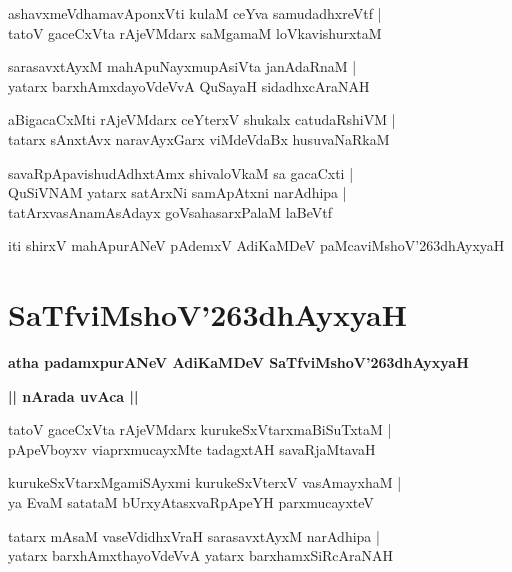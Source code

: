 \documentclass[twoside,12pt,openright]{book}
\def\S{\char'263}
\newcounter{shloka}[chapter]
\def\uvaca#1{\centerline{{\large\textbf{#1}}}}
\begin{document}
\begin{shloka}
ashavxmeVdhamavAponxVti kulaM ceYva samudadhxreVtf |\\
tatoV gaceCxVta rAjeVMdarx saMgamaM loVkavishurxtaM 
\end{shloka}

\begin{shloka}
sarasavxtAyxM mahApuNayxmupAsiVta janAdaRnaM  |\\
yatarx barxhAmxdayoVdeVvA QuSayaH sidadhxcAraNAH 
\end{shloka}


\begin{shloka}
aBigacaCxMti rAjeVMdarx ceYterxV shukalx catudaRshiVM |\\
tatarx sAnxtAvx naravAyxGarx viMdeVdaBx husuvaNaRkaM 
\end{shloka}

\begin{shloka}
savaRpApavishudAdhxtAmx shivaloVkaM sa gacaCxti |\\
QuSiVNAM yatarx satArxNi samApAtxni narAdhipa |\\
tatArxvasAnamAsAdayx goVsahasarxPalaM laBeVtf 
\end{shloka}

\begin{center}
iti shirxV mahApurANeV pAdemxV AdiKaMDeV paMcaviMshoV\S dhAyxyaH
\end{center}

\chapter{SaTfviMshoV\S dhAyxyaH}

\begin{center}
{\LARGE\bfseries atha padamxpurANeV AdiKaMDeV SaTfviMshoV\S dhAyxyaH}
\end{center}

\uvaca{|| nArada uvAca ||}

\begin{shloka}
tatoV gaceCxVta rAjeVMdarx kurukeSxVtarxmaBiSuTxtaM |\\
pApeVboyxv viaprxmucayxMte tadagxtAH savaRjaMtavaH 
\end{shloka}

\begin{shloka}
kurukeSxVtarxMgamiSAyxmi kurukeSxVterxV vasAmayxhaM |\\
ya EvaM satataM bUrxyAtasxvaRpApeYH parxmucayxteV 
\end{shloka}

\begin{shloka}
tatarx mAsaM vaseVdidhxVraH sarasavxtAyxM narAdhipa |\\
yatarx barxhAmxthayoVdeVvA yatarx barxhamxSiRcAraNAH
\end{shloka}
\end{document}
